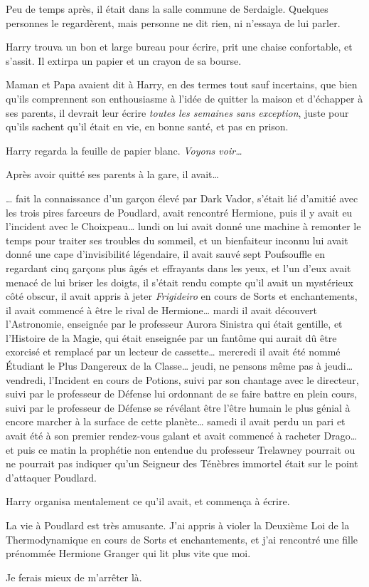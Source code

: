 Peu de temps après, il était dans la salle commune de Serdaigle. Quelques personnes le regardèrent, mais personne ne dit rien, ni n'essaya de lui parler.

Harry trouva un bon et large bureau pour écrire, prit une chaise confortable, et s'assit. Il extirpa un papier et un crayon de sa bourse.

Maman et Papa avaient dit à Harry, en des termes tout sauf incertains, que bien qu'ils comprennent son enthousiasme à l'idée de quitter la maison et d'échapper à ses parents, il devrait leur écrire \emph{toutes les semaines sans exception}, juste pour qu'ils sachent qu'il était en vie, en bonne santé, et pas en prison.

Harry regarda la feuille de papier blanc. \emph{Voyons voir…}

Après avoir quitté ses parents à la gare, il avait…

… fait la connaissance d'un garçon élevé par Dark Vador, s'était lié d'amitié avec les trois pires farceurs de Poudlard, avait rencontré Hermione, puis il y avait eu l'incident avec le Choixpeau… lundi on lui avait donné une machine à remonter le temps pour traiter ses troubles du sommeil, et un bienfaiteur inconnu lui avait donné une cape d'invisibilité légendaire, il avait sauvé sept Poufsouffle en regardant cinq garçons plus âgés et effrayants dans les yeux, et l'un d'eux avait menacé de lui briser les doigts, il s'était rendu compte qu'il avait un mystérieux côté obscur, il avait appris à jeter \emph{Frigideiro} en cours de Sorts et enchantements, il avait commencé à être le rival de Hermione… mardi il avait découvert l'Astronomie, enseignée par le professeur Aurora Sinistra qui était gentille, et l'Histoire de la Magie, qui était enseignée par un fantôme qui aurait dû être exorcisé et remplacé par un lecteur de cassette… mercredi il avait été nommé Étudiant le Plus Dangereux de la Classe… jeudi, ne pensons même pas à jeudi… vendredi, l'Incident en cours de Potions, suivi par son chantage avec le directeur, suivi par le professeur de Défense lui ordonnant de se faire battre en plein cours, suivi par le professeur de Défense se révélant être l'être humain le plus génial à encore marcher à la surface de cette planète… samedi il avait perdu un pari et avait été à son premier rendez-vous galant et avait commencé à racheter Drago… et puis ce matin la prophétie non entendue du professeur Trelawney pourrait ou ne pourrait pas indiquer qu'un Seigneur des Ténèbres immortel était sur le point d'attaquer Poudlard.

Harry organisa mentalement ce qu'il avait, et commença à écrire.
\begin{writtenNote}

La vie à Poudlard est très amusante. J'ai appris à violer la Deuxième Loi de la Thermodynamique en cours de Sorts et enchantements, et j'ai rencontré une fille prénommée Hermione Granger qui lit plus vite que moi.

Je ferais mieux de m'arrêter là.

\end{writtenNote}

